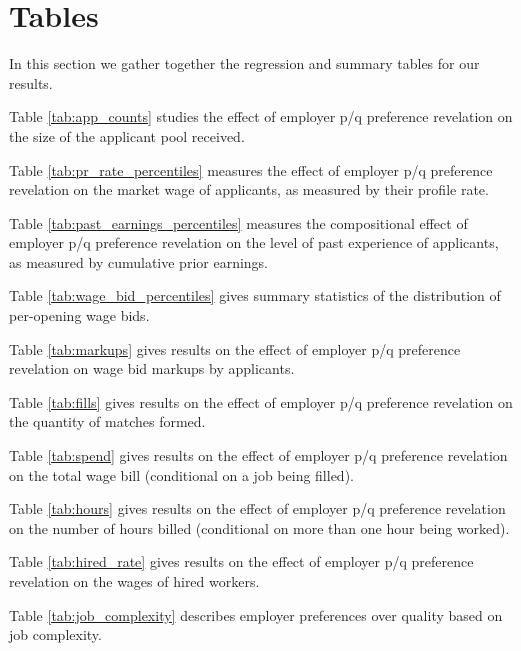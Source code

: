 \documentclass[prodmode,acmec]{ec-acmsmall}
\begin{document}





\section{Tables} \label{sec:tables}

In this section we gather together the regression and summary tables for our results.

Table \ref{tab:app_counts} studies the effect of employer p/q preference revelation on the size of the applicant pool received.

Table \ref{tab:pr_rate_percentiles} measures the effect of employer p/q preference revelation on the market wage of applicants, as measured by their profile rate.

Table \ref{tab:past_earnings_percentiles} measures the compositional effect of employer p/q preference revelation on the level of past experience of applicants, as measured by cumulative prior earnings.

Table \ref{tab:wage_bid_percentiles} gives summary statistics of the distribution of per-opening wage bids.

Table \ref{tab:markups} gives results on the effect of employer p/q preference revelation on wage bid markups by applicants.

Table \ref{tab:fills} gives results on the effect of employer p/q preference revelation on the quantity of matches formed.

Table \ref{tab:spend} gives results on the effect of employer p/q preference revelation on the total wage bill (conditional on a job being filled).

Table \ref{tab:hours} gives results on the effect of employer p/q preference revelation on the number of hours billed (conditional on more than one hour being worked).

Table \ref{tab:hired_rate} gives results on the effect of employer p/q preference revelation on the wages of hired workers.

Table \ref{tab:job_complexity} describes employer preferences over quality based on job complexity.
\end{document}
